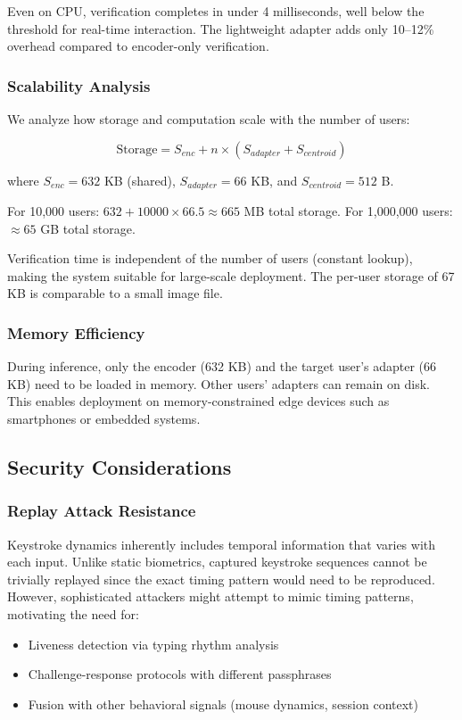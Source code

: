 \documentclass{ieeeaccess}
\begin{document}
{Even on CPU, verification completes in under 4 milliseconds, well below the threshold for real-time interaction. The lightweight adapter adds only 10--12\% overhead compared to encoder-only verification.

\subsubsection{Scalability Analysis}
We analyze how storage and computation scale with the number of users:

\begin{equation}
\text{Storage} = S_{enc} + n \times (S_{adapter} + S_{centroid})
\label{eq:storage}
\end{equation}

where $S_{enc} = 632$ KB (shared), $S_{adapter} = 66$ KB, and $S_{centroid} = 512$ B.

For 10,000 users: $632 + 10000 \times 66.5 \approx 665$ MB total storage.
For 1,000,000 users: $\approx 65$ GB total storage.

Verification time is independent of the number of users (constant lookup), making the system suitable for large-scale deployment. The per-user storage of 67 KB is comparable to a small image file.

\subsubsection{Memory Efficiency}
During inference, only the encoder (632 KB) and the target user's adapter (66 KB) need to be loaded in memory. Other users' adapters can remain on disk. This enables deployment on memory-constrained edge devices such as smartphones or embedded systems.

\subsection{Security Considerations}

\subsubsection{Replay Attack Resistance}
Keystroke dynamics inherently includes temporal information that varies with each input. Unlike static biometrics, captured keystroke sequences cannot be trivially replayed since the exact timing pattern would need to be reproduced. However, sophisticated attackers might attempt to mimic timing patterns, motivating the need for:
\begin{itemize}
\item Liveness detection via typing rhythm analysis
\item Challenge-response protocols with different passphrases
\item Fusion with other behavioral signals (mouse dynamics, session context)
\end{itemize}

}
\end{document}
